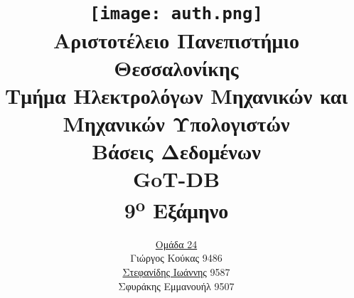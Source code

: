 \title{
	\texttt{[image: auth.png]}\\
	\large{Αριστοτέλειο Πανεπιστήμιο Θεσσαλονίκης}\\
	\large{Τμήμα Ηλεκτρολόγων Μηχανικών και Μηχανικών Υπολογιστών}\\
	\vspace{2cm}
	\LARGE{Βάσεις Δεδομένων}\\
	\LARGE{GoT-DB}\\
	\vspace{0.5cm}
	\large{9\textsuperscript{o} Εξάμηνο}\\
	\vspace{3cm}
}

\author{
	\underline{Ομάδα 24}\\
	Γιώργος Κούκας		9486\\
	\href{mailto:istefanidi@auth.gr}{Στεφανίδης Ιωάννης} 9587\\
	Σφυράκης Εμμανουήλ 9507
	\vspace{3cm}
}
